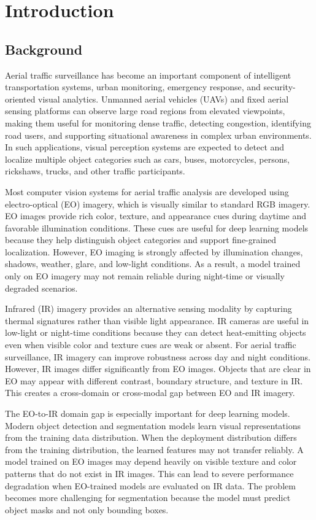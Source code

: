 \chapter{Introduction}

\section{Background}

Aerial traffic surveillance has become an important component of intelligent transportation systems, urban monitoring, emergency response, and security-oriented visual analytics. Unmanned aerial vehicles (UAVs) and fixed aerial sensing platforms can observe large road regions from elevated viewpoints, making them useful for monitoring dense traffic, detecting congestion, identifying road users, and supporting situational awareness in complex urban environments. In such applications, visual perception systems are expected to detect and localize multiple object categories such as cars, buses, motorcycles, persons, rickshaws, trucks, and other traffic participants.

Most computer vision systems for aerial traffic analysis are developed using electro-optical (EO) imagery, which is visually similar to standard RGB imagery. EO images provide rich color, texture, and appearance cues during daytime and favorable illumination conditions. These cues are useful for deep learning models because they help distinguish object categories and support fine-grained localization. However, EO imaging is strongly affected by illumination changes, shadows, weather, glare, and low-light conditions. As a result, a model trained only on EO imagery may not remain reliable during night-time or visually degraded scenarios.

Infrared (IR) imagery provides an alternative sensing modality by capturing thermal signatures rather than visible light appearance. IR cameras are useful in low-light or night-time conditions because they can detect heat-emitting objects even when visible color and texture cues are weak or absent. For aerial traffic surveillance, IR imagery can improve robustness across day and night conditions. However, IR images differ significantly from EO images. Objects that are clear in EO may appear with different contrast, boundary structure, and texture in IR. This creates a cross-domain or cross-modal gap between EO and IR imagery.

The EO-to-IR domain gap is especially important for deep learning models. Modern object detection and segmentation models learn visual representations from the training data distribution. When the deployment distribution differs from the training distribution, the learned features may not transfer reliably. A model trained on EO images may depend heavily on visible texture and color patterns that do not exist in IR images. This can lead to severe performance degradation when EO-trained models are evaluated on IR data. The problem becomes more challenging for segmentation because the model must predict object masks and not only bounding boxes.

